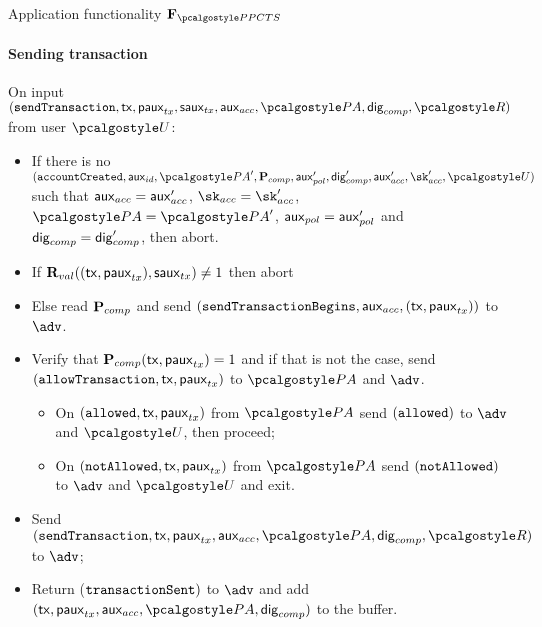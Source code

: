 \documentclass[runningheads,10pt]{llncs}
\numberwithin{equation}{section}
\begin{document}
\begin{funcbox}{Application functionality $\func{\PPCTS}$}
  \paragraph{Sending transaction} On input $(\sendTransaction,
  \tx, \pauxtx, \sauxtx, \auxacc, \polas, \policydig, \relay)$ from user
  $\user$:
  \begin{itemize}
  \item If there is no $(\accountCreated, \auxid, \polas', \comppolicy,
    \auxpol', \policydig', \auxacc', \skacc', \user)$ such that $\mathsf{aux}_{acc} =
    \mathsf{aux}_{acc}'$, $\skacc = \skacc'$, $\polas = \polas'$, $\mathsf{aux}_{pol} = \mathsf{aux}_{pol}'$ and
    $\mathsf{dig}_{comp} = \mathsf{dig}_{comp}'$, then abort.
  \item If $\mathbf{R}_{val}((\mathsf{tx}, \mathsf{paux}_{tx}), \mathsf{saux}_{tx}) \neq 1$ then abort
  \item Else read $\mathbf{P}_{comp}$ and send $(\mathtt{sendTransactionBegins}, \mathsf{aux}_{acc},
    (\mathsf{tx}, \mathsf{paux}_{tx}))$ to $\adv$.
  \item Verify that $\mathbf{P}_{comp}(\mathsf{tx}, \mathsf{paux}_{tx}) = 1$ and if that is not the case, send
    $(\mathtt{allowTransaction}, \mathsf{tx}, \mathsf{paux}_{tx})$ to $\polas$ and $\adv$. 
    \begin{itemize}
    \item On $(\mathtt{allowed}, \mathsf{tx}, \mathsf{paux}_{tx})$ from $\polas$ send $(\mathtt{allowed})$ to
      $\adv$ and $\user$, then proceed;
    \item On $(\mathtt{notAllowed}, \mathsf{tx}, \mathsf{paux}_{tx})$ from $\polas$ send $(\mathtt{notAllowed})$
      to $\adv$ and $\user$ and exit.
    \end{itemize}
  \item Send $(\sendTransaction, \tx, \pauxtx, \auxacc, \polas, \policydig,
    \relay)$ to $\adv$;
  \item Return ($\mathtt{transactionSent})$ to $\adv$ and add $(\tx,
    \paux_{tx}, \auxacc, \polas, \policydig)$ to the buffer.
  \end{itemize}


\end{funcbox}
\end{document}
